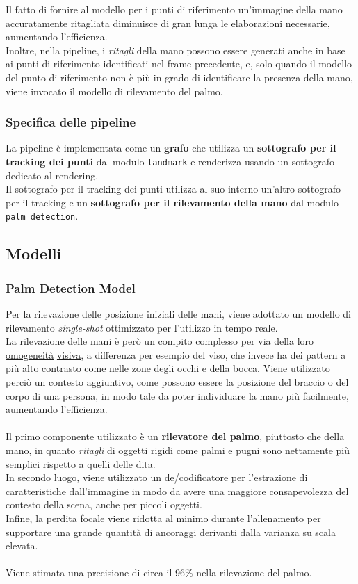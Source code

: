 \noindent Il fatto di fornire al modello per i punti di riferimento un'immagine della mano accuratamente ritagliata diminuisce di gran lunga le elaborazioni necessarie, aumentando l'efficienza.\\
Inoltre, nella pipeline, i \textit{ritagli} della mano possono essere generati anche in base ai punti di riferimento identificati nel frame precedente, e, solo quando il modello del punto di riferimento non è più in grado di identificare la presenza della mano, viene invocato il modello di rilevamento del palmo.

\subsubsection{Specifica delle pipeline}
La pipeline è implementata come un \textbf{grafo} che utilizza un \textbf{sottografo per il tracking dei punti} dal modulo \texttt{landmark} e renderizza usando un sottografo dedicato al rendering.\\Il sottografo per il tracking dei punti utilizza al suo interno un'altro sottografo per il tracking e un \textbf{sottografo per il rilevamento della mano} dal modulo \texttt{palm detection}.

\subsection{Modelli}

\subsubsection{Palm Detection Model} 

Per la rilevazione delle posizione iniziali delle mani, viene adottato un modello di rilevamento \textit{single-shot} ottimizzato per l'utilizzo in tempo reale.\\
La rilevazione delle mani è però un compito complesso per via della loro \underline{omogeneità} \underline{visiva}, a differenza per esempio del viso, che invece ha dei pattern a più alto contrasto come nelle zone degli occhi e della bocca.
Viene utilizzato perciò un \underline{contesto aggiuntivo}, come possono essere la posizione del braccio o del corpo di una persona, in modo tale da poter individuare la mano più facilmente, aumentando l'efficienza.\\
\\
\noindent Il primo componente utilizzato è un \textbf{rilevatore del palmo}, piuttosto che della mano, in quanto \textit{ritagli} di oggetti rigidi come palmi e pugni sono nettamente più semplici rispetto a quelli delle dita.\\
In secondo luogo, viene utilizzato un de/codificatore per l'estrazione di caratteristiche dall'immagine in modo da avere una maggiore consapevolezza del contesto della scena, anche per piccoli oggetti.\\
Infine, la perdita focale viene ridotta al minimo durante l'allenamento per supportare una grande quantità di ancoraggi derivanti dalla varianza su scala elevata.\\
\\
\noindent Viene stimata una precisione di circa il 96\% nella rilevazione del palmo.

